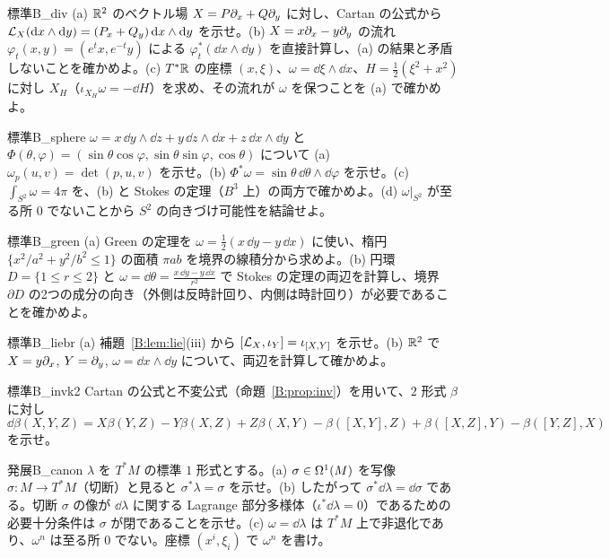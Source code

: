 \begin{probl}{標準}{B_div}
(a) $\mathbb R^2$ のベクトル場 $X=P\partial_x+Q\partial_y$ に対し、Cartan の公式から $\mathcal L_X(\mathrm{d} x\wedge\mathrm{d} y)=(P_x+Q_y)\,\mathrm{d} x\wedge\mathrm{d} y$ を示せ。(b) $X=x\partial_x-y\partial_y$ の流れ $\varphi_t(x,y)=(e^tx,e^{-t}y)$ による $\varphi_t^*(\dd x\wedge\dd y)$ を直接計算し、(a) の結果と矛盾しないことを確かめよ。(c) $T^*\mathbb R$ の座標 $(x,\xi)$、$\omega=\dd\xi\wedge\dd x$、$H=\frac12(\xi^2+x^2)$ に対し $X_H$（$\iota_{X_H}\omega=-\dd H$）を求め、その流れが $\omega$ を保つことを (a) で確かめよ。
\end{probl}

\begin{probl}{標準}{B_sphere}
$\omega=x\,\dd y\wedge\dd z+y\,\dd z\wedge\dd x+z\,\dd x\wedge\dd y$ と $\Phi(\theta,\varphi)=(\sin\theta\cos\varphi,\sin\theta\sin\varphi,\cos\theta)$ について (a) $\omega_p(u,v)=\det(p,u,v)$ を示せ。(b) $\Phi^*\omega=\sin\theta\,\dd\theta\wedge\dd\varphi$ を示せ。(c) $\int_{S^2}\omega=4\pi$ を、(b) と Stokes の定理（$B^3$ 上）の両方で確かめよ。(d) $\omega|_{S^2}$ が至る所 $0$ でないことから $S^2$ の向きづけ可能性を結論せよ。
\end{probl}

\begin{probl}{標準}{B_green}
(a) Green の定理を $\omega=\frac12(x\,\dd y-y\,\dd x)$ に使い、楕円 $\{x^2/a^2+y^2/b^2\le1\}$ の面積 $\pi ab$ を境界の線積分から求めよ。(b) 円環 $D=\{1\le r\le2\}$ と $\omega=\dd\theta=\frac{x\,\dd y-y\,\dd x}{r^2}$ で Stokes の定理の両辺を計算し、境界 $\partial D$ の2つの成分の向き（外側は反時計回り、内側は時計回り）が必要であることを確かめよ。
\end{probl}

\begin{probl}{標準}{B_liebr}
(a) 補題~\ref{B:lem:lie}(iii) から $[\mathcal L_X,\iota_Y]=\iota_{[X,Y]}$ を示せ。(b) $\mathbb R^2$ で $X=y\partial_x$, $Y=\partial_y$, $\omega=\dd x\wedge\dd y$ について、両辺を計算して確かめよ。
\end{probl}

\begin{probl}{標準}{B_invk2}
Cartan の公式と不変公式（命題~\ref{B:prop:inv}）を用いて、$2$ 形式 $\beta$ に対し
\[
\dd\beta(X,Y,Z)=X\beta(Y,Z)-Y\beta(X,Z)+Z\beta(X,Y)-\beta([X,Y],Z)+\beta([X,Z],Y)-\beta([Y,Z],X)
\]
を示せ。
\end{probl}

\begin{probl}{発展}{B_canon}
$\lambda$ を $T^*M$ の標準 $1$ 形式とする。(a) $\sigma\in\Omega^1(M)$ を写像 $\sigma:M\to T^*M$（切断）と見ると $\sigma^*\lambda=\sigma$ を示せ。(b) したがって $\sigma^*\dd\lambda=\dd\sigma$ である。切断 $\sigma$ の像が $\dd\lambda$ に関する Lagrange 部分多様体（$\iota^*\dd\lambda=0$）であるための必要十分条件は $\sigma$ が閉であることを示せ。(c) $\omega=\dd\lambda$ は $T^*M$ 上で非退化であり、$\omega^n$ は至る所 $0$ でない。座標 $(x^i,\xi_i)$ で $\omega^n$ を書け。
\end{probl}

